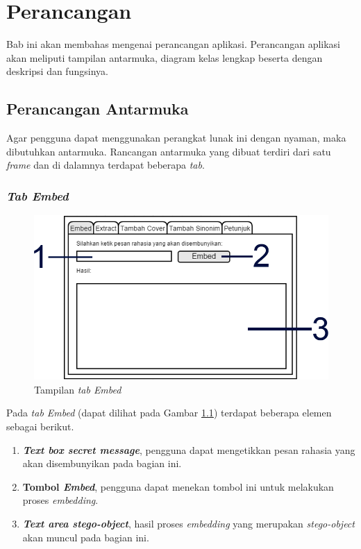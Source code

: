 \chapter{Perancangan}
Bab ini akan membahas mengenai perancangan aplikasi. Perancangan aplikasi akan meliputi tampilan antarmuka, diagram kelas lengkap beserta dengan deskripsi dan fungsinya.

\section{Perancangan Antarmuka}

Agar pengguna dapat menggunakan perangkat lunak ini dengan nyaman, maka dibutuhkan antarmuka. Rancangan antarmuka yang dibuat terdiri dari satu \textit{frame} dan di dalamnya terdapat beberapa \textit{tab}.

\subsection{\textit{Tab Embed}}

\begin{figure}[H]
	\centering
	\includegraphics[scale=1.8]{Gambar/tab-embed}
	\caption{Tampilan \textit{tab Embed}} 
	\label{fig:1-tab-embed}
\end{figure}

Pada \textit{tab Embed} (dapat dilihat pada Gambar \ref{fig:1-tab-embed}) terdapat beberapa elemen sebagai berikut.

\begin{enumerate}
	\item \textbf{\textit{Text box secret message}}, pengguna dapat mengetikkan pesan rahasia yang akan disembunyikan pada bagian ini.
	\item \textbf{Tombol \textit{Embed}}, pengguna dapat menekan tombol ini untuk melakukan proses \textit{embedding}.
	\item \textbf{\textit{Text area stego-object}}, hasil proses \textit{embedding} yang merupakan \textit{stego-object} akan muncul pada bagian ini.
\end{enumerate}


